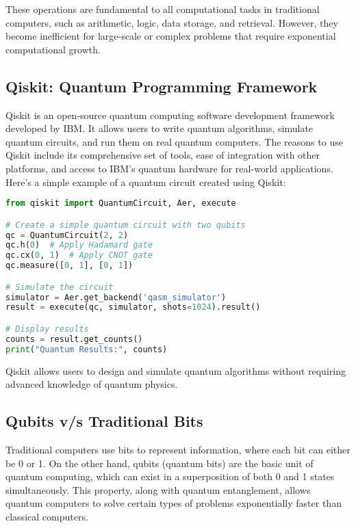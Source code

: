 \documentclass[12pt,a4paper]{article}
\begin{document}
These operations are fundamental to all computational tasks in traditional computers, such as arithmetic, logic, data storage, and retrieval. However, they become inefficient for large-scale or complex problems that require exponential computational growth.




\subsection{Qiskit: Quantum Programming Framework}
Qiskit is an open-source quantum computing software development framework developed by IBM. It allows users to write quantum algorithms, simulate quantum circuits, and run them on real quantum computers. The reasons to use Qiskit include its comprehensive set of tools, ease of integration with other platforms, and access to IBM's quantum hardware for real-world applications. Here's a simple example of a quantum circuit created using Qiskit:

\begin{tcolorbox}[title=Qiskit Example]
\begin{lstlisting}[language=Python]
from qiskit import QuantumCircuit, Aer, execute

# Create a simple quantum circuit with two qubits
qc = QuantumCircuit(2, 2)
qc.h(0)  # Apply Hadamard gate
qc.cx(0, 1)  # Apply CNOT gate
qc.measure([0, 1], [0, 1])

# Simulate the circuit
simulator = Aer.get_backend('qasm_simulator')
result = execute(qc, simulator, shots=1024).result()

# Display results
counts = result.get_counts()
print("Quantum Results:", counts)
\end{lstlisting}
\end{tcolorbox}

Qiskit allows users to design and simulate quantum algorithms without requiring advanced knowledge of quantum physics.

\subsection{Qubits v/s Traditional Bits}
Traditional computers use bits to represent information, where each bit can either be 0 or 1. On the other hand, qubits (quantum bits) are the basic unit of quantum computing, which can exist in a superposition of both 0 and 1 states simultaneously. This property, along with quantum entanglement, allows quantum computers to solve certain types of problems exponentially faster than classical computers.
\end{document}
